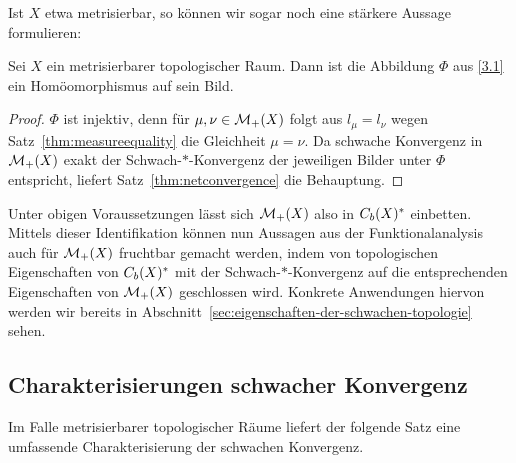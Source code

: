 \documentclass[../main/main.tex]{subfiles}
\begin{document}
	Ist $X$ etwa metrisierbar, so können wir sogar noch eine stärkere Aussage formulieren:
	
	\begin{Hilfssatz}
		Sei $X$ ein metrisierbarer topologischer Raum. Dann ist die Abbildung $\Phi$ aus \eqref{3.1} ein Homöomorphismus auf sein Bild.
	\end{Hilfssatz}

	\begin{proof}
		$\Phi$ ist injektiv, denn für $\mu, \nu \in \mathcal{M}_{+}(X)$ folgt aus $l_\mu = l_\nu$ wegen Satz~\ref{thm:measureequality} die Gleichheit $\mu = \nu$. 
		Da schwache Konvergenz in $\mathcal{M}_{+}(X)$ exakt der Schwach-$\ast$-Konvergenz der jeweiligen Bilder unter $\Phi$ entspricht, liefert Satz~\ref{thm:netconvergence}
		die Behauptung.
	\end{proof}

	Unter obigen Voraussetzungen lässt sich $\mathcal{M}_{+}(X)$ also in $C_b(X)^\ast$ einbetten. Mittels dieser Identifikation können nun Aussagen aus der 
	Funktionalanalysis auch für $\mathcal{M}_{+}(X)$ fruchtbar gemacht werden, indem von topologischen Eigenschaften von
	$C_b(X)^\ast$ mit der Schwach-$\ast$-Konvergenz auf die entsprechenden Eigenschaften von 
	$\mathcal{M}_{+}(X)$ geschlossen wird. Konkrete Anwendungen hiervon werden wir bereits in Abschnitt~\ref{sec:eigenschaften-der-schwachen-topologie} sehen.
	
	\subsection{Charakterisierungen schwacher Konvergenz}
	\label{subsec:CharakterisierungenSchwacherKonvergenz}
	
	Im Falle metrisierbarer topologischer Räume liefert der folgende Satz eine umfassende Charakterisierung der schwachen Konvergenz.
	
\end{document}
